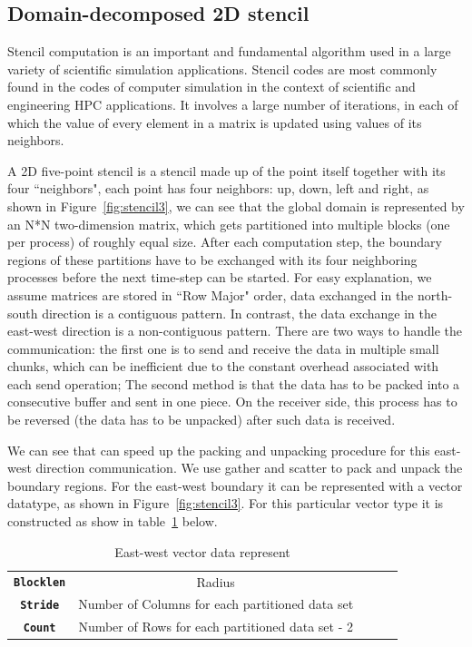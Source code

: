 \documentclass[conference]{IEEEtran}
\begin{document}
\subsection{Domain-decomposed 2D stencil}\label{sec:stencil}
Stencil computation is an important and fundamental algorithm
used in a large variety of scientific simulation applications.
Stencil codes are most commonly found in the codes of computer
simulation in the context of scientific and engineering HPC applications.
It involves a large number of iterations,
in each of which the value of every element in a matrix is
updated using values of its neighbors.

A 2D five-point stencil is a stencil made up of the point itself
together with its four ``neighbors", each point has four neighbors: up, down,
left and right, as shown in Figure~\ref{fig:stencil3}, we can see that the global
domain is represented by an N*N two-dimension matrix,
which gets partitioned into multiple blocks (one per process) of roughly equal size.
After each computation step, the boundary regions of
these partitions have to be exchanged with its four neighboring processes
before the next time-step can be started.
For easy explanation, we assume matrices are stored in ``Row Major" order,
data exchanged in the north-south direction is a contiguous pattern.
In contrast, the data exchange in the east-west direction is a non-contiguous pattern.
There are two ways to handle the communication: the first one is to send and receive the
data in multiple small chunks, which can be inefficient due to the constant overhead associated
with each send operation; The second method is that the data has to be
packed into a consecutive buffer and sent in one piece. On the receiver side,
this process has to be reversed (the data has to be
unpacked) after such data is received.

We can see that \ourwork can speed up the packing and unpacking procedure for this east-west
direction communication. We use gather and scatter to pack and unpack the boundary regions.
For the east-west boundary it can be represented with a vector datatype, as shown in Figure~\ref{fig:stencil3}.
For this particular vector type it is constructed as show in table~\ref{tab:ewvector} below.
\begin{table}
  \centering
  \caption{East-west vector data represent}\label{tab:ewvector}
  \small
  \begin{tabular}{cclll}
    \toprule
    \midrule
      \texttt{\bf Blocklen} & Radius \\
      \texttt{\bf Stride} & Number of Columns for each partitioned data set \\
      \texttt{\bf Count} & Number of Rows for each partitioned data set - 2 \\
      \bottomrule
  \end{tabular}
\end{table}
\end{document}

